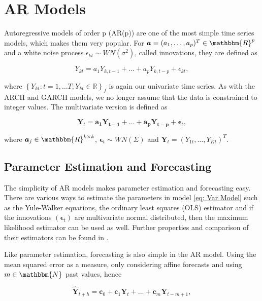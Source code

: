 \section{AR Models}
\label{sec: Ar Models}

Autoregressive models of order p (AR(p))  are one of the most simple time series models, which makes them very popular. For $\bm{a}=(a_1,\ldots,a_p)^T \in \mathbbm{R}^p$ and a white noise process $\epsilon_{kt} \sim WN(\sigma^2)$, called innovations, they are defined as 

\begin{equation}
Y_{kt} = a_1Y_{k,t-1} + \ldots + a_pY_{k,t-p} + \epsilon_{kt},
\label{eq: Ar model}
\end{equation}

where $\left\{Y_{kt}:t=1,\ldots T; Y_{kt} \in \mathbb{R}\right\}_f$ is again our univariate time series. As with the ARCH and GARCH models, we no longer assume that the data is constrained to integer values. The multivariate version is defined as 

\begin{equation}
\bm{Y}_{t} = \bm{a_1 Y_{t-1}}+ \ldots + \bm{a_p Y_{t-p}} + \bm{\epsilon}_{t},
\label{eq: Var Model}
\end{equation}

where $\bm{a}_j \in \mathbbm{R}^{k \times k}$, $\bm{\epsilon}_t \sim WN(\Sigma)$ and $\bm{Y}_t = (Y_{1t},\ldots,Y_{Kt})^T$.%

\subsection{Parameter Estimation and Forecasting}
\label{sec: AR Estimation and Forecasting}

The simplicity of AR models makes parameter estimation and forecasting easy. There are various ways to estimate the parameters in model \ref{eq: Var Model} such as the Yule-Walker equations, the ordinary least squares (OLS) estimator and if the innovations $(\bm{\epsilon}_t)$ are multivariate normal distributed, then the maximum likelihood estimator can be used as well. Further properties and comparison of their estimators can be found in \cite{Scherrer:2021}. 

Like parameter estimation, forecasting is also simple in the AR model. Using the mean squared error as a measure, only considering affine forecasts and using $m \in \mathbbm{N}$ past values, hence 

\begin{equation}
\hat{\bm{Y}}_{t+h} = \bm{c}_0 + \bm{c}_1\bm{Y}_{t} + \ldots + \bm{c}_m\bm{Y}_{t-m+1},
\label{eq:Forecasting general}
\end{equation}

